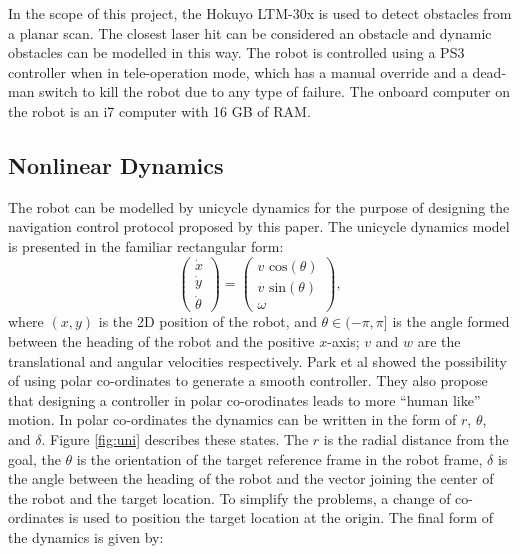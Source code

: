 \documentclass[journal]{IEEEconf}
\begin{document}
In the scope of this project, the Hokuyo LTM-30x is used to detect obstacles from a planar scan. The closest laser hit can be considered an obstacle and dynamic obstacles can be modelled in this way. The robot is controlled using a PS3 controller when in tele-operation mode, which has a manual override and a dead-man switch to kill the robot due to any type of failure. The onboard computer on the robot is an i7 computer with 16 GB of RAM.

\subsection{Nonlinear Dynamics}

The robot can be modelled by unicycle dynamics for the purpose of designing the navigation control protocol proposed by this paper. The unicycle dynamics model is presented in the familiar rectangular form:
\begin{equation}
\left(
\begin{matrix}
\dot{x}\\
\dot{y}\\
\dot{\theta}
\end{matrix}
\right)
=
\left(
\begin{matrix}
v \text{ cos}(\theta)\\
v \text{ sin}(\theta)\\
\omega
\end{matrix}
\right),
\end{equation}
where $(x,y)$ is the 2D position of the robot, and $\theta \in (-\pi ,\pi]$ is the angle formed between the heading of the robot and the positive $x$-axis; $v$ and $w$ are the translational and angular velocities respectively. Park et al \cite{park2011} showed the possibility of using polar co-ordinates to generate a smooth controller. They also propose that designing a controller in polar co-orodinates leads to more ``human like'' motion. 
In polar co-ordinates the dynamics can be written in the form of $r$, $\theta$, and $\delta$. Figure \ref{fig:uni} describes these states. The $r$ is the radial distance from the goal, the $\theta$ is the orientation of the target reference frame in the robot frame, $\delta$ is the angle between the heading of the robot and the vector joining the center of the robot and the target location. To simplify the problems, a change of co-ordinates is used to position the target location at the origin. The final form of the dynamics is given by:  
\end{document}
